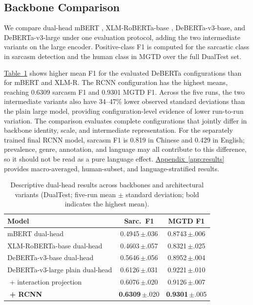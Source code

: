 \documentclass[11pt]{article}
\newcommand{\Appref}[1]{\hyperref[#1]{Appendix~\ref*{#1}}}
\newcommand{\Tabref}[1]{\hyperref[#1]{Table~\ref*{#1}}}
\begin{document}
\subsection{Backbone Comparison}
\label{sec:backbone}

We compare dual-head mBERT \citep{devlin2019bert}, XLM-RoBERTa-base \citep{conneau2020xlmr}, DeBERTa-v3-base, and DeBERTa-v3-large \citep{he2023debertav3} under one evaluation protocol, adding the two intermediate variants on the large encoder. Positive-class F1 is computed for the sarcastic class in sarcasm detection and the human class in MGTD over the full DualTest set.

\Tabref{tab:backbone} shows higher mean F1 for the evaluated DeBERTa configurations than for mBERT and XLM-R. The RCNN configuration has the highest means, reaching 0.6309 sarcasm F1 and 0.9301 MGTD F1. Across the five runs, the two intermediate variants also have 34--47\% lower observed standard deviations than the plain large model, providing configuration-level evidence of lower run-to-run variation. The comparison evaluates complete configurations that jointly differ in backbone identity, scale, and intermediate representation. For the separately trained final RCNN model, sarcasm F1 is 0.819 in Chinese and 0.429 in English; prevalence, genre, annotation, and language may all contribute to this difference, so it should not be read as a pure language effect. \Appref{app:results} provides macro-averaged, human-subset, and language-stratified results.

\begin{table}[t]
  \centering
  \footnotesize
  \setlength{\tabcolsep}{2pt}
  \begin{tabular}{@{}p{3.25cm}cc@{}}
    \toprule
    \textbf{Model} & \textbf{Sarc.\ F1} & \textbf{MGTD F1} \\
    \midrule
    mBERT dual-head & 0.4945\,{\scriptsize$\pm$.036} & 0.8743\,{\scriptsize$\pm$.006} \\
    XLM-RoBERTa-base dual-head & 0.4603\,{\scriptsize$\pm$.057} & 0.8321\,{\scriptsize$\pm$.025} \\
    DeBERTa-v3-base dual-head & 0.5646\,{\scriptsize$\pm$.056} & 0.8952\,{\scriptsize$\pm$.004} \\
    DeBERTa-v3-large plain dual-head & 0.6126\,{\scriptsize$\pm$.031} & 0.9221\,{\scriptsize$\pm$.010} \\
    \,\,+ interaction projection & 0.6076\,{\scriptsize$\pm$.020} & 0.9126\,{\scriptsize$\pm$.007} \\
    \textbf{\,\,+ RCNN} & \textbf{0.6309}\,{\scriptsize$\pm$.020} & \textbf{0.9301}\,{\scriptsize$\pm$.005} \\
    \bottomrule
  \end{tabular}
  \caption{Descriptive dual-head results across backbones and architectural variants (DualTest; five-run mean $\pm$ standard deviation; bold indicates the highest mean).}
  \label{tab:backbone}
\end{table}
\end{document}

